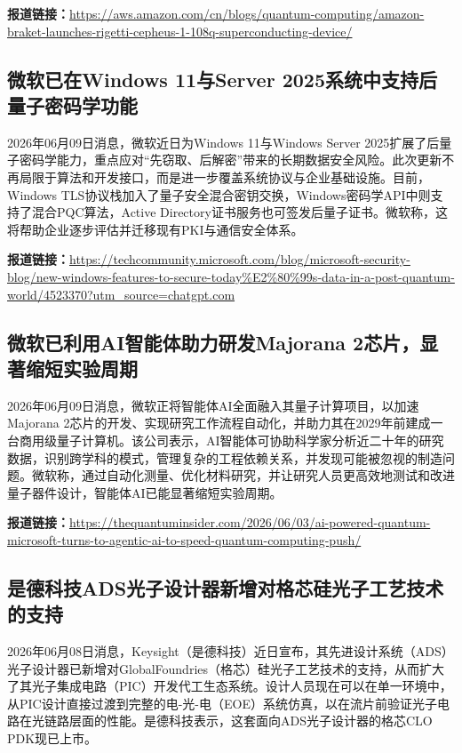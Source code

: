 \documentclass[12pt,a4paper]{ctexart}
\begin{document}
\noindent\textbf{报道链接：}\url{https://aws.amazon.com/cn/blogs/quantum-computing/amazon-braket-launches-rigetti-cepheus-1-108q-superconducting-device/}

\subsection{ 微软已在Windows 11与Server 2025系统中支持后量子密码学功能 }

2026年06月09日消息，微软近日为Windows 11与Windows Server 2025扩展了后量子密码学能力，重点应对“先窃取、后解密”带来的长期数据安全风险。此次更新不再局限于算法和开发接口，而是进一步覆盖系统协议与企业基础设施。目前，Windows TLS协议栈加入了量子安全混合密钥交换，Windows密码学API中则支持了混合PQC算法，Active Directory证书服务也可签发后量子证书。微软称，这将帮助企业逐步评估并迁移现有PKI与通信安全体系。

\noindent\textbf{报道链接：}\url{https://techcommunity.microsoft.com/blog/microsoft-security-blog/new-windows-features-to-secure-today\%E2\%80\%99s-data-in-a-post-quantum-world/4523370?utm\_source=chatgpt.com}


\subsection{ 微软已利用AI智能体助力研发Majorana 2芯片，显著缩短实验周期 }

2026年06月09日消息，微软正将智能体AI全面融入其量子计算项目，以加速Majorana 2芯片的开发、实现研究工作流程自动化，并助力其在2029年前建成一台商用级量子计算机。该公司表示，AI智能体可协助科学家分析近二十年的研究数据，识别跨学科的模式，管理复杂的工程依赖关系，并发现可能被忽视的制造问题。微软称，通过自动化测量、优化材料研究，并让研究人员更高效地测试和改进量子器件设计，智能体AI已能显著缩短实验周期。

\noindent\textbf{报道链接：}\url{https://thequantuminsider.com/2026/06/03/ai-powered-quantum-microsoft-turns-to-agentic-ai-to-speed-quantum-computing-push/}

\subsection{ 是德科技ADS光子设计器新增对格芯硅光子工艺技术的支持 }

2026年06月08日消息，Keysight（是德科技）近日宣布，其先进设计系统（ADS）光子设计器已新增对GlobalFoundries（格芯）硅光子工艺技术的支持，从而扩大了其光子集成电路（PIC）开发代工生态系统。设计人员现在可以在单一环境中，从PIC设计直接过渡到完整的电-光-电（EOE）系统仿真，以在流片前验证光子电路在光链路层面的性能。是德科技表示，这套面向ADS光子设计器的格芯CLO PDK现已上市。
\end{document}
